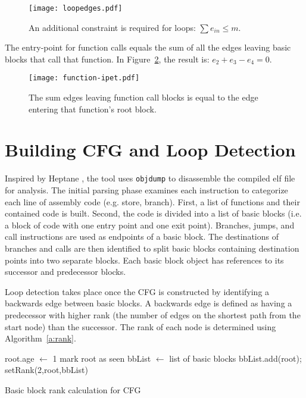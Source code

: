 \begin{figure}[h]
\centering
\texttt{[image: loopedges.pdf]}
\caption{An additional constraint is required for loops: $\sum e_{in} \leq m$.} 
\label{f:loopedges}
\end{figure}


The entry-point for function calls equals the sum of all the edges leaving basic blocks that call that function. In Figure~\ref{f:function-ipet}, the result is: $e_2+e_3-e_4 = 0$. 

\begin{figure}[h]
\centering
\texttt{[image: function-ipet.pdf]}
\caption{The sum edges leaving function call blocks is equal to the edge entering that function's root block.} 
\label{f:function-ipet}
\end{figure}
 

\section{Building CFG and Loop Detection}
\label{s:cfg}
	Inspired by Heptane \cite{heptane}, the tool uses \texttt{objdump} to disassemble the compiled elf file for analysis. 
	The initial parsing phase examines each instruction to categorize each line of assembly code (e.g. store, branch). 
	First, a list of functions and their contained code is built. Second, the code is divided into a list of basic blocks (i.e. a block of code with one entry point and one exit point). 
	Branches, jumps, and call instructions are used as endpoints of a basic block. 
	The destinations of branches and calls are then identified to split basic blocks containing destination points into two separate blocks. 
	Each basic block object has references to its successor and predecessor blocks.

	Loop detection takes place once the CFG is constructed by identifying a backwards edge between basic blocks. 
	A backwards edge is defined as  having a predecessor with higher rank (the number of edges on the shortest path from the start node) than the successor.
	The rank of each node is determined using Algorithm~\ref{a:rank}. 
	
	
\begin{algorithm}


root.age $\leftarrow$ 1\;
mark root as seen\;
bbList $\leftarrow$ list of basic blocks\;
bbList.add(root);
setRank(2,root,bbList)\;

\caption{Basic block rank calculation for CFG}
\label{a:rank}
\end{algorithm}

